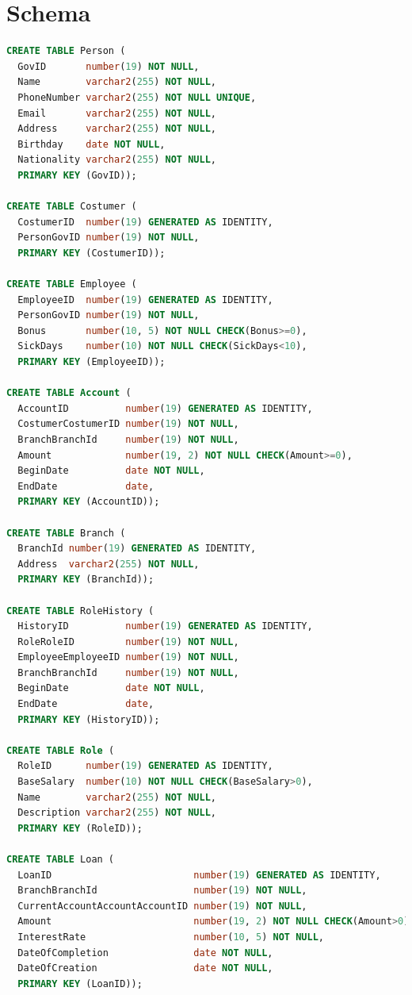 \documentclass[a4paper, 10pt]{article}
\begin{document}
\section{Schema}
\begin{lstlisting}[language=SQL]
CREATE TABLE Person (
  GovID       number(19) NOT NULL, 
  Name        varchar2(255) NOT NULL, 
  PhoneNumber varchar2(255) NOT NULL UNIQUE, 
  Email       varchar2(255) NOT NULL, 
  Address     varchar2(255) NOT NULL, 
  Birthday    date NOT NULL, 
  Nationality varchar2(255) NOT NULL, 
  PRIMARY KEY (GovID));

CREATE TABLE Costumer (
  CostumerID  number(19) GENERATED AS IDENTITY, 
  PersonGovID number(19) NOT NULL, 
  PRIMARY KEY (CostumerID));

CREATE TABLE Employee (
  EmployeeID  number(19) GENERATED AS IDENTITY, 
  PersonGovID number(19) NOT NULL, 
  Bonus       number(10, 5) NOT NULL CHECK(Bonus>=0), 
  SickDays    number(10) NOT NULL CHECK(SickDays<10), 
  PRIMARY KEY (EmployeeID));

CREATE TABLE Account (
  AccountID          number(19) GENERATED AS IDENTITY, 
  CostumerCostumerID number(19) NOT NULL, 
  BranchBranchId     number(19) NOT NULL, 
  Amount             number(19, 2) NOT NULL CHECK(Amount>=0), 
  BeginDate          date NOT NULL, 
  EndDate            date, 
  PRIMARY KEY (AccountID));

CREATE TABLE Branch (
  BranchId number(19) GENERATED AS IDENTITY, 
  Address  varchar2(255) NOT NULL, 
  PRIMARY KEY (BranchId));

CREATE TABLE RoleHistory (
  HistoryID          number(19) GENERATED AS IDENTITY, 
  RoleRoleID         number(19) NOT NULL, 
  EmployeeEmployeeID number(19) NOT NULL, 
  BranchBranchId     number(19) NOT NULL, 
  BeginDate          date NOT NULL, 
  EndDate            date, 
  PRIMARY KEY (HistoryID));

CREATE TABLE Role (
  RoleID      number(19) GENERATED AS IDENTITY, 
  BaseSalary  number(10) NOT NULL CHECK(BaseSalary>0), 
  Name        varchar2(255) NOT NULL, 
  Description varchar2(255) NOT NULL, 
  PRIMARY KEY (RoleID));

CREATE TABLE Loan (
  LoanID                         number(19) GENERATED AS IDENTITY, 
  BranchBranchId                 number(19) NOT NULL, 
  CurrentAccountAccountAccountID number(19) NOT NULL, 
  Amount                         number(19, 2) NOT NULL CHECK(Amount>0), 
  InterestRate                   number(10, 5) NOT NULL, 
  DateOfCompletion               date NOT NULL, 
  DateOfCreation                 date NOT NULL, 
  PRIMARY KEY (LoanID));


\end{lstlisting}
\end{document}

